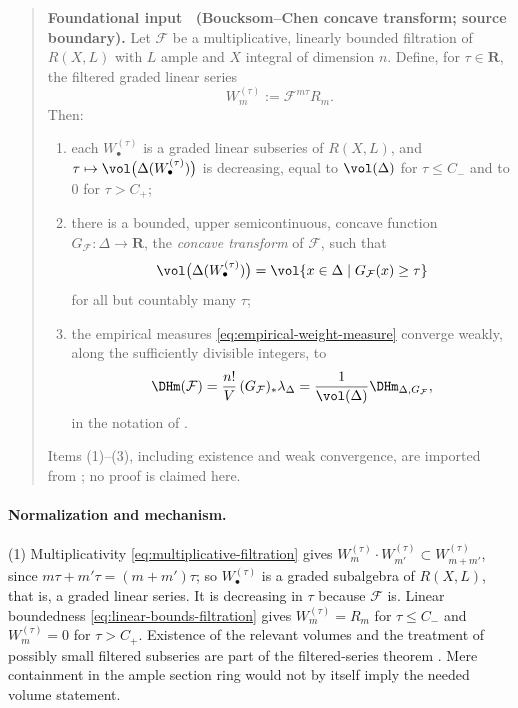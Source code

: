 \label{thm:ch33-dh-concave-transform}
\begin{quote}
\textbf{Foundational input \thetheorem\ (Boucksom--Chen concave transform;
source boundary).}
Let $\mathcal F$ be a multiplicative, linearly bounded filtration of
$R(X,L)$ with $L$ ample and $X$ integral of dimension $n$.  Define,
for $\tau\in\mathbf R$, the filtered graded linear series
\begin{equation}
\label{eq:ch33-filtered-series}
 W^{(\tau)}_m:=\mathcal F^{m\tau}R_m .
\end{equation}
Then:
\begin{enumerate}
\item each $W^{(\tau)}_\bullet$ is a graded linear subseries of
 $R(X,L)$, and
 $\tau\mapsto\vol\bigl(\Delta(W^{(\tau)}_\bullet)\bigr)$ is decreasing,
 equal to $\vol(\Delta)$ for $\tau\leq C_-$ and to $0$ for
 $\tau>C_+$;
\item there is a bounded, upper semicontinuous, concave function
 $G_{\mathcal F}:\Delta\to\mathbf R$, the \emph{concave transform} of
 $\mathcal F$, such that
\begin{equation}
\label{eq:ch33-concave-transform-levels}
 \vol\bigl(\Delta(W^{(\tau)}_\bullet)\bigr)
 =\vol\{x\in\Delta\mid G_{\mathcal F}(x)\geq\tau\}
\end{equation}
 for all but countably many $\tau$;
\item the empirical measures \eqref{eq:empirical-weight-measure} converge
 weakly, along the sufficiently divisible integers, to
\begin{equation}
\label{eq:ch33-dh-is-pushforward}
 \DHm(\mathcal F)
 =\frac{n!}{V}\,(G_{\mathcal F})_\ast\lambda_\Delta
 =\frac{1}{\vol(\Delta)}\DHm_{\Delta,G_{\mathcal F}} ,
\end{equation}
 in the notation of .
\end{enumerate}
Items (1)--(3), including existence and weak convergence, are imported from
\cite[Theorem~A]{BC11}; no proof is claimed here.
\end{quote}

\paragraph{Normalization and mechanism.}
(1)  Multiplicativity \eqref{eq:multiplicative-filtration} gives
$W^{(\tau)}_m\cdot W^{(\tau)}_{m'}\subset W^{(\tau)}_{m+m'}$, since
$m\tau+m'\tau=(m+m')\tau$; so $W^{(\tau)}_\bullet$ is a graded
subalgebra of $R(X,L)$, that is, a graded linear series.  It is decreasing
in $\tau$ because $\mathcal F$ is.  Linear boundedness
\eqref{eq:linear-bounds-filtration} gives
$W^{(\tau)}_m=R_m$ for $\tau\leq C_-$ and $W^{(\tau)}_m=0$ for
$\tau>C_+$.  Existence of the relevant volumes and the treatment of
possibly small filtered subseries are part of the filtered-series theorem
\cite[Theorem~A]{BC11}.  Mere containment in the ample section ring would
not by itself imply the needed volume statement.

